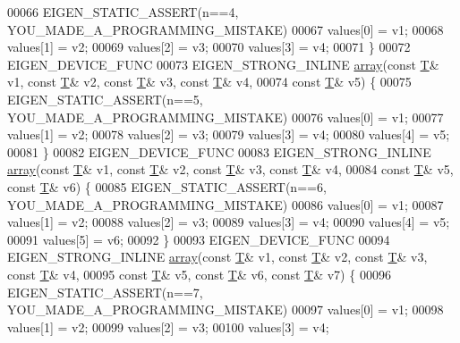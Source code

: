 \begin{DoxyCode}
00066     EIGEN\_STATIC\_ASSERT(n==4, YOU\_MADE\_A\_PROGRAMMING\_MISTAKE)
00067     values[0] = v1;
00068     values[1] = v2;
00069     values[2] = v3;
00070     values[3] = v4;
00071   \}
00072   EIGEN\_DEVICE\_FUNC
00073   EIGEN\_STRONG\_INLINE \hyperlink{class_eigen_1_1array}{array}(\textcolor{keyword}{const} \hyperlink{group___sparse_core___module}{T}& v1, \textcolor{keyword}{const} \hyperlink{group___sparse_core___module}{T}& v2, \textcolor{keyword}{const} \hyperlink{group___sparse_core___module}{T}& v3, \textcolor{keyword}{const} 
      \hyperlink{group___sparse_core___module}{T}& v4,
00074                             \textcolor{keyword}{const} \hyperlink{group___sparse_core___module}{T}& v5) \{
00075     EIGEN\_STATIC\_ASSERT(n==5, YOU\_MADE\_A\_PROGRAMMING\_MISTAKE)
00076     values[0] = v1;
00077     values[1] = v2;
00078     values[2] = v3;
00079     values[3] = v4;
00080     values[4] = v5;
00081   \}
00082   EIGEN\_DEVICE\_FUNC
00083   EIGEN\_STRONG\_INLINE \hyperlink{class_eigen_1_1array}{array}(\textcolor{keyword}{const} \hyperlink{group___sparse_core___module}{T}& v1, \textcolor{keyword}{const} \hyperlink{group___sparse_core___module}{T}& v2, \textcolor{keyword}{const} \hyperlink{group___sparse_core___module}{T}& v3, \textcolor{keyword}{const} 
      \hyperlink{group___sparse_core___module}{T}& v4,
00084                             \textcolor{keyword}{const} \hyperlink{group___sparse_core___module}{T}& v5, \textcolor{keyword}{const} \hyperlink{group___sparse_core___module}{T}& v6) \{
00085     EIGEN\_STATIC\_ASSERT(n==6, YOU\_MADE\_A\_PROGRAMMING\_MISTAKE)
00086     values[0] = v1;
00087     values[1] = v2;
00088     values[2] = v3;
00089     values[3] = v4;
00090     values[4] = v5;
00091     values[5] = v6;
00092   \}
00093   EIGEN\_DEVICE\_FUNC
00094   EIGEN\_STRONG\_INLINE \hyperlink{class_eigen_1_1array}{array}(\textcolor{keyword}{const} \hyperlink{group___sparse_core___module}{T}& v1, \textcolor{keyword}{const} \hyperlink{group___sparse_core___module}{T}& v2, \textcolor{keyword}{const} \hyperlink{group___sparse_core___module}{T}& v3, \textcolor{keyword}{const} 
      \hyperlink{group___sparse_core___module}{T}& v4,
00095                             \textcolor{keyword}{const} \hyperlink{group___sparse_core___module}{T}& v5, \textcolor{keyword}{const} \hyperlink{group___sparse_core___module}{T}& v6, \textcolor{keyword}{const} \hyperlink{group___sparse_core___module}{T}& v7) \{
00096     EIGEN\_STATIC\_ASSERT(n==7, YOU\_MADE\_A\_PROGRAMMING\_MISTAKE)
00097     values[0] = v1;
00098     values[1] = v2;
00099     values[2] = v3;
00100     values[3] = v4;

\end{DoxyCode}
